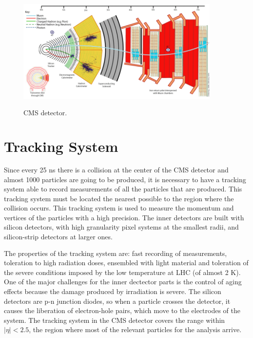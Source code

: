 

 \begin{figure}[h]
 \centering
 \caption{CMS detector.}
 \includegraphics[width=0.9\textwidth]{./Capitulos/CMS/CMS}  
 \label{CMS_detector}
 \end{figure}

\section{Tracking System}

Since every 25 ns there is a collision at the center of the CMS detector and almost 1000 particles are going to be produced, it is necessary to have a tracking system able to record measurements 
of all the particles that are produced. This tracking system must be located the nearest possible to the region where the collision occurs. This tracking system is used to measure the momentum and 
vertices of the particles with a high precision. The inner detectors are built with silicon detectors, with high granularity pixel systems at the smallest radii, and silicon-strip detectors at 
larger ones. 


The properties of the tracking system are: fast recording of measurements, toleration to high radiation doses, ensembled with light material and toleration of the severe conditions imposed by the low temperature at LHC (of almost 2 K). One of the major challenges for the inner dectector parts is the control of aging effects because the damage produced by irradiation is severe. The silicon detectors are p-n junction diodes, so when a particle crosses the detector, it causes the liberation of electron-hole pairs, which move to the electrodes of the system. The tracking system in the CMS detector covers the range within $|\eta|<2.5$, the region where most of the relevant particles for the analysis arrive. 

